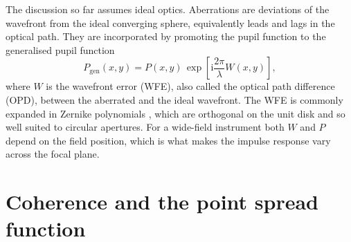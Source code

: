 \documentclass[11pt]{book}
\begin{document}
The discussion so far assumes ideal optics. Aberrations are deviations of the wavefront from the ideal converging sphere, equivalently leads and lags in the optical path. They are incorporated by promoting the pupil function to the generalised pupil function
\begin{equation}
P_{\mathrm{gen}}(x,y) = P(x,y)\,\exp\!\left[\mathrm{i}\frac{2\pi}{\lambda}W(x,y)\right],
\label{eq:genpupil}
\end{equation}
where $W$ is the wavefront error (WFE), also called the optical path difference (OPD), between the aberrated and the ideal wavefront. The WFE is commonly expanded in Zernike polynomials \cite{noll1976}, which are orthogonal on the unit disk and so well suited to circular apertures. For a wide-field instrument both $W$ and $P$ depend on the field position, which is what makes the impulse response vary across the focal plane.

\section{Coherence and the point spread function}
\end{document}
